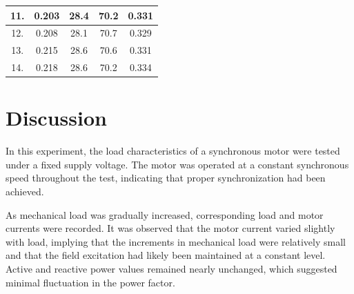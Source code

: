 \documentclass[a4paper,12pt]{article}
\begin{document}
\begin{table}[H]
\begin{tabular}{|c|c|c|c|c|}
			11.                                                          & 0.203                                                                      & 28.4                                                                      & 70.2                                                                             & 0.331                                                                            \\ \hline
			12.                                                          & 0.208                                                                      & 28.1                                                                      & 70.7                                                                             & 0.329                                                                            \\ \hline
			13.                                                          & 0.215                                                                      & 28.6                                                                      & 70.6                                                                             & 0.331                                                                            \\ \hline
			14.                                                          & 0.218                                                                      & 28.6                                                                      & 70.2                                                                             & 0.334                                                                            \\ \hline
		\end{tabular}
	\end{table}
	
	\section{Discussion}

In this experiment, the load characteristics of a synchronous motor were tested under a fixed supply voltage. The motor was operated at a constant synchronous speed throughout the test, indicating that proper synchronization had been achieved.

As mechanical load was gradually increased, corresponding load and motor currents were recorded. It was observed that the motor current varied slightly with load, implying that the increments in mechanical load were relatively small and that the field excitation had likely been maintained at a constant level. Active and reactive power values remained nearly unchanged, which suggested minimal fluctuation in the power factor.
\end{document}
